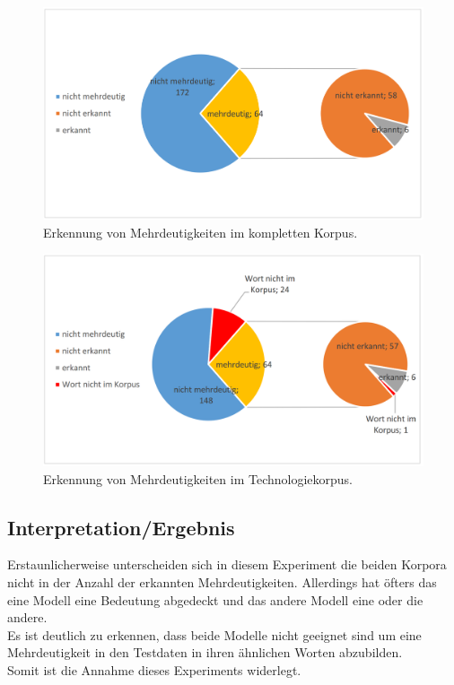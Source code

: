 \documentclass[12pt,a4paper]{report}
\begin{document}
		\begin{figure}[p]
  \begin{center}
	\includegraphics[scale=0.4]{MehrdeutigkeitFull.PNG}
  \end{center}  
  \caption{Erkennung von Mehrdeutigkeiten im kompletten Korpus.}

\end{figure}
\begin{figure}[p]
  \begin{center}
	\includegraphics[scale=0.4]{MehrdeutigkeitTech.PNG}
  \end{center}  
  \caption{Erkennung von Mehrdeutigkeiten im Technologiekorpus.}
  \end{figure}	
  
		\newpage
		\subsection{Interpretation/Ergebnis}
		Erstaunlicherweise unterscheiden sich in diesem Experiment die beiden Korpora nicht in der Anzahl der erkannten Mehrdeutigkeiten. Allerdings hat öfters das eine Modell eine Bedeutung abgedeckt und das andere Modell eine oder die andere.\\
		Es ist deutlich zu erkennen, dass beide Modelle nicht geeignet sind um eine Mehrdeutigkeit in den Testdaten in ihren ähnlichen Worten abzubilden.\\
		Somit ist die Annahme dieses Experiments widerlegt.
		
\end{document}

